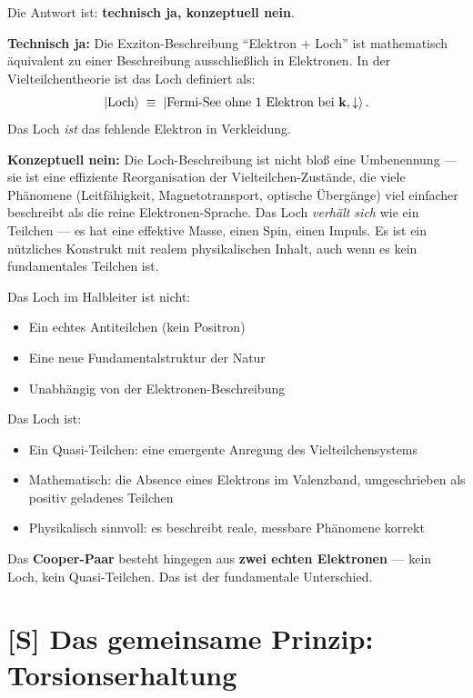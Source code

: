 Die Antwort ist: \textbf{technisch ja, konzeptuell nein}.

\textbf{Technisch ja:}
Die Exziton-Beschreibung ``Elektron + Loch'' ist mathematisch
äquivalent zu einer Beschreibung ausschließlich in Elektronen.
In der Vielteilchentheorie ist das Loch definiert als:
\begin{equation}
  \left|\text{Loch}\right\rangle \;\equiv\; \left|\text{Fermi-See ohne 1 Elektron bei }
  \mathbf{k}, \downarrow\right\rangle.
\end{equation}
Das Loch \emph{ist} das fehlende Elektron in Verkleidung.

\textbf{Konzeptuell nein:}
Die Loch-Beschreibung ist nicht bloß eine Umbenennung ---
sie ist eine effiziente Reorganisation der Vielteilchen-Zustände,
die viele Phänomene (Leitfähigkeit, Magnetotransport,
optische Übergänge) viel einfacher beschreibt als die
reine Elektronen-Sprache.
Das Loch \emph{verhält sich} wie ein Teilchen --- es hat
eine effektive Masse, einen Spin, einen Impuls.
Es ist ein nützliches Konstrukt mit realem physikalischen Inhalt,
auch wenn es kein fundamentales Teilchen ist.

\begin{keypoint}
Das Loch im Halbleiter ist nicht:
\begin{itemize}
  \item Ein echtes Antiteilchen (kein Positron)
  \item Eine neue Fundamentalstruktur der Natur
  \item Unabhängig von der Elektronen-Beschreibung
\end{itemize}

Das Loch ist:
\begin{itemize}
  \item Ein Quasi-Teilchen: eine emergente Anregung des
    Vielteilchensystems
  \item Mathematisch: die Absence eines Elektrons im
    Valenzband, umgeschrieben als positiv geladenes Teilchen
  \item Physikalisch sinnvoll: es beschreibt reale,
    messbare Phänomene korrekt
\end{itemize}

Das \textbf{Cooper-Paar} besteht hingegen aus
\textbf{zwei echten Elektronen} --- kein Loch,
kein Quasi-Teilchen. Das ist der fundamentale Unterschied.
\end{keypoint}

\section{[S] Das gemeinsame Prinzip: Torsionserhaltung}
\label{sec:torsionserhaltung}

